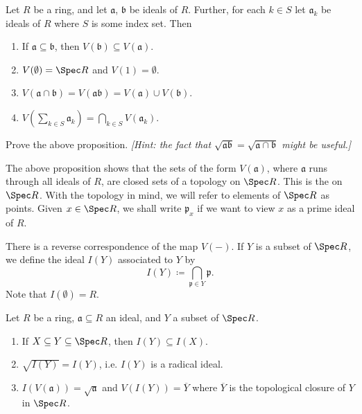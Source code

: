 \begin{proposition}\label{chap2:zariski-topology}
	Let $R$ be a ring, and let $\mathfrak{a}$, $\mathfrak{b}$ be ideals of $R$. Further, for each $k \in S$ let $\mathfrak{a}_k$ be ideals of $R$ where $S$ is some index set. Then
	
	\begin{enumerate}
		\item If $\mathfrak{a} \subseteq \mathfrak{b}$, then $V(\mathfrak{b}) \subseteq V(\mathfrak{a})$.
		
		\item $V(\emptyset) = \Spec R$ and $V(1) = \emptyset$.
		
		\item $V(\mathfrak{a} \cap \mathfrak{b}) = V(\mathfrak{a}\mathfrak{b}) = V(\mathfrak{a}) \cup V(\mathfrak{b})$.
		
		\item $V(\sum_{k \in S} \mathfrak{a}_k) = \bigcap_{k \in S} V(\mathfrak{a}_k)$.
	\end{enumerate}
\end{proposition}
\begin{exercise}
	Prove the above proposition. \textit{[Hint: the fact that $\sqrt{\mathfrak{a}\mathfrak{b}} = \sqrt{\mathfrak{a} \cap \mathfrak{b}}$ might be useful.]}
\end{exercise}

The above proposition shows that the sets of the form $V(\mathfrak{a})$, where $\mathfrak{a}$ runs through all ideals of $R$, are closed sets of a topology on $\Spec R$. This is the  on $\Spec R$. With the topology in mind, we will refer to elements of $\Spec R$ as points. Given $x \in \Spec R$, we shall write $\mathfrak{p}_x$ if we want to view $x$ as a prime ideal of $R$.

There is a reverse correspondence of the map $V(-)$. If $Y$ is a subset of $\Spec R$, we define the ideal $I(Y)$ associated to $Y$ by
\begin{equation*}
	I(Y) \coloneqq \bigcap_{\mathfrak{p} \in Y} \mathfrak{p}.
\end{equation*}
Note that $I(\emptyset) = R$. 

\begin{proposition}\label{chap2:I-and-V-correspondence}
	Let $R$ be a ring, $\mathfrak{a} \subseteq R$ an ideal, and $Y$ a subset of $\Spec R$.
	\begin{enumerate}
		\item If $X \subseteq Y \subseteq \Spec R$, then $I(Y) \subseteq I(X)$.
		\item $\sqrt{I(Y)} = I(Y)$, i.e. $I(Y)$ is a radical ideal.
		\item $I(V(\mathfrak{a})) = \sqrt{\mathfrak{a}}$ and $V(I(Y)) = \overline{Y}$ where $\overline{Y}$ is the topological closure of $Y$ in $\Spec R$.
	\end{enumerate}
\end{proposition}

